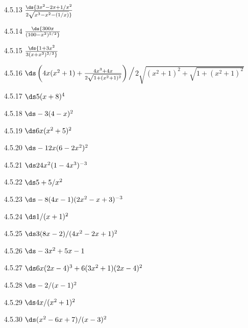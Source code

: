 \begin{Answer}{4.5.13}
$ \ds{3x^2-2x+1/x^2\over 2\sqrt{x^3-x^2-(1/x)}}$
\end{Answer}
\begin{Answer}{4.5.14}
$ \ds{300 x \over(100-x^2)^{5/2}}$
\end{Answer}
\begin{Answer}{4.5.15}
$ \ds{ 1 + 3 x^2\over3(x+x^3)^{2/3}}$
\end{Answer}
\begin{Answer}{4.5.16}
$\ds \left(4x(x^2+1)+{4x^3+4x\over2\sqrt{1+(x^2+1)^2}}\right)\Big/$\hfill\break$2\sqrt{(x^2+1)^2+\sqrt{1+(x^2+1)^2}}$
\end{Answer}
\begin{Answer}{4.5.17}
$\ds 5(x+8)^4$
\end{Answer}
\begin{Answer}{4.5.18}
$\ds -3(4-x)^2$
\end{Answer}
\begin{Answer}{4.5.19}
$\ds 6x(x^2+5)^2$
\end{Answer}
\begin{Answer}{4.5.20}
$\ds -12x(6-2x^2)^2$
\end{Answer}
\begin{Answer}{4.5.21}
$\ds 24x^2(1-4x^3)^{-3}$
\end{Answer}
\begin{Answer}{4.5.22}
$\ds 5+5/x^2$
\end{Answer}
\begin{Answer}{4.5.23}
$\ds -8(4x-1)(2x^2-x+3)^{-3}$
\end{Answer}
\begin{Answer}{4.5.24}
$\ds 1/(x+1)^2$
\end{Answer}
\begin{Answer}{4.5.25}
$\ds 3(8x-2)/(4x^2-2x+1)^2$
\end{Answer}
\begin{Answer}{4.5.26}
$\ds -3x^2+5x-1$
\end{Answer}
\begin{Answer}{4.5.27}
$\ds 6x(2x-4)^3+6(3x^2+1)(2x-4)^2$
\end{Answer}
\begin{Answer}{4.5.28}
$\ds -2/(x-1)^2$
\end{Answer}
\begin{Answer}{4.5.29}
$\ds 4x/(x^2+1)^2$
\end{Answer}
\begin{Answer}{4.5.30}
$\ds (x^2-6x+7)/(x-3)^2$
\end{Answer}
